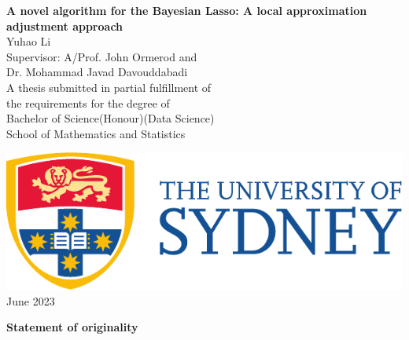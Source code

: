 \begin{titlepage}
\centering
{}
\vspace*{\fill}
\huge{\textbf{{\bf\Huge A novel algorithm for the Bayesian Lasso: A local approximation adjustment approach}}}\\



\vspace{2.5cm}
\LARGE{Yuhao Li}\\
\vspace{1cm}
\large{Supervisor: A/Prof. John Ormerod and \\ Dr. Mohammad Javad Davouddabadi}\\
\large{A thesis submitted in partial fulfillment of \\ the requirements for the degree of \\  Bachelor of Science(Honour)(Data Science)} \\
\vspace{1cm}
\large{School of Mathematics and Statistics}\\
\vspace{1.5cm}
\date{September 2021}
    \includegraphics[scale=0.75]{UsydLogo.pdf}\\
\vspace{1.5cm}
\large{June 2023}\\
\vspace*{\fill}

\thispagestyle{empty}
\end{titlepage}



\pagebreak
\hspace{0pt}
\begin{center}
    \textbf{\large Statement of originality}\\
    \vspace{0.5cm}
\end{center}

